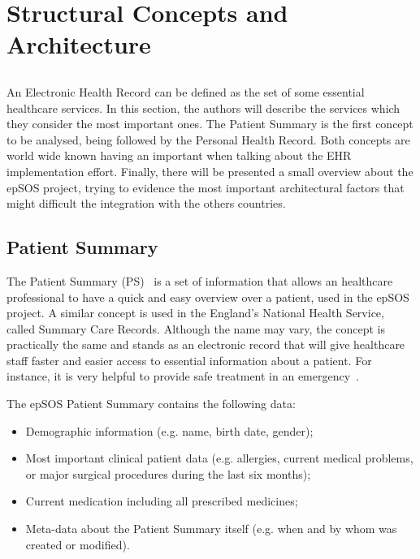\chapter{Structural Concepts and Architecture}\label{sec:struct_concepts}

\section*{}

An Electronic Health Record can be defined as the set of some essential healthcare services. In this section, the authors will describe the services which they consider the most important ones. The Patient Summary is the first concept to be analysed, being followed by the Personal Health Record. Both concepts are world wide known having an important when talking about the EHR implementation effort. Finally, there will be presented a small overview about the epSOS project, trying to evidence the most important architectural factors that might difficult the integration with the others countries.

\section{Patient Summary} \label{sec:pat_sum}

The Patient Summary (PS)~\citep{EPSOS_PS} is a set of information that allows an healthcare professional to have a quick and easy overview over a patient, used in the epSOS project. A similar concept is used in the England's National Health Service, called Summary Care Records. Although the name may vary, the concept is practically the same and stands as an electronic record that will give healthcare staff faster and easier access to essential information about a patient. For instance, it is very helpful to provide safe treatment in an emergency~\citep{Service2010}.

The epSOS Patient Summary contains the following data:
\begin{itemize}
\item Demographic information (e.g. name, birth date, gender);
\item Most important clinical patient data (e.g. allergies, current medical problems, or major surgical procedures during the last six months);
\item Current medication including all prescribed medicines;
\item Meta-data about the Patient Summary itself (e.g. when and by whom was created or modified).
\end{itemize}

